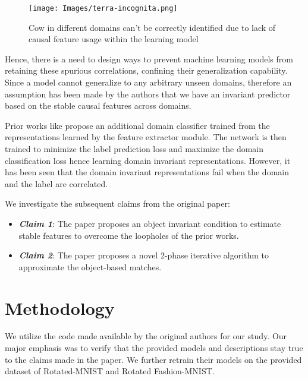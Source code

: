 \begin{center}
    \begin{figure}[h!]
    \begin{center}
      \texttt{[image: Images/terra-incognita.png]}
      \caption{Cow in different domains can't be correctly identified due to lack of causal feature usage within the learning model \cite{DBLP:journals/corr/abs-1807-04975}}
      \label{fig:cow}
      \end{center}
    \end{figure}
\end{center}

Hence, there is a need to design ways to prevent machine learning models from retaining these spurious correlations, confining their generalization capability. Since a model cannot generalize to any arbitrary unseen domains, therefore an assumption has been made by the authors that we have an invariant predictor based on the stable causal features across domains. 

Prior works like \cite{ganin2016domain} propose an additional domain classifier trained from the representations learned by the feature extractor module. The network is then trained to minimize the label prediction loss and maximize the domain classification loss hence learning domain invariant representations. However, it has been seen that the domain invariant representations fail when the domain and the label are correlated.

We investigate the subsequent claims from the original paper:

\begin{itemize}
    \item \textbf{\textit{Claim 1}}: The paper proposes an object invariant condition to estimate stable features to overcome the loopholes of the prior works.
    \item \textbf{\textit{Claim 2}}: The paper proposes a novel 2-phase iterative algorithm to approximate the object-based matches.
\end{itemize}

\section{Methodology}
We utilize the code made available by the original authors for our study. Our major emphasis was to verify that the provided models and descriptions stay true to the claims made in the paper. We further retrain their models on the provided dataset of Rotated-MNIST and Rotated Fashion-MNIST. 


